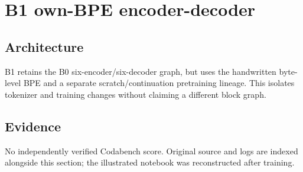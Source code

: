 \section{B1 own-BPE encoder-decoder}
\subsection{Architecture} B1 retains the B0 six-encoder/six-decoder graph, but uses the handwritten byte-level BPE and a separate scratch/continuation pretraining lineage. This isolates tokenizer and training changes without claiming a different block graph.
\subsection{Evidence} No independently verified Codabench score. Original source and logs are indexed alongside this section; the illustrated notebook was reconstructed after training.
